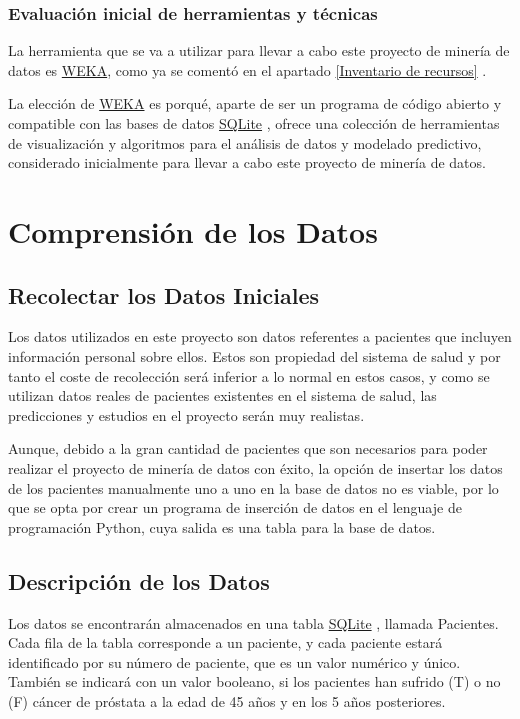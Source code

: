 \documentclass{article}
\begin{document}
\subsubsection{Evaluación inicial de herramientas y técnicas}\label{Evaluación inicial de herramientas y técnicas}
La herramienta que se va a utilizar para llevar a cabo este proyecto de minería de datos es \href{https://www.cs.waikato.ac.nz/~ml/weka/}{WEKA}, como ya se comentó en el apartado \ref{Inventario de recursos} . 

La elección de \href{https://www.cs.waikato.ac.nz/~ml/weka/}{WEKA} es porqué, aparte de ser un programa de código abierto y compatible con las bases de datos \href{https://www.sqlite.org/copyright.html}{SQLite} , ofrece una colección de herramientas de visualización y algoritmos para el análisis de datos y modelado predictivo, considerado inicialmente para llevar a cabo este proyecto de minería de datos.  

\section{Comprensión de los Datos}

\subsection{Recolectar los Datos Iniciales}
Los datos utilizados en este proyecto son datos referentes a pacientes que incluyen información personal sobre ellos. Estos son propiedad del sistema de salud y por tanto el coste de recolección será inferior a lo normal en estos casos, y como se utilizan datos reales de pacientes existentes en el sistema de salud, las predicciones y estudios en el proyecto serán muy realistas.

Aunque, debido a la gran cantidad de pacientes que son necesarios para poder realizar el proyecto de minería de datos con éxito, la opción de insertar los datos de los pacientes manualmente uno a uno en la base de datos no es viable, por lo que se opta por crear un programa de inserción de datos en el lenguaje de programación Python, cuya salida es una tabla para la base de datos.

\subsection{Descripción de los Datos}\label{Descripción de los Datos}
Los datos se encontrarán almacenados en una tabla \href{https://www.sqlite.org/copyright.html}{SQLite} , llamada Pacientes. Cada fila de la tabla corresponde a un paciente, y cada paciente estará identificado por su número de paciente, que es un valor numérico y único. También se indicará con un valor booleano, si los pacientes han sufrido (T) o no (F) cáncer de próstata a la edad de 45 años y en los 5 años posteriores.
\end{document}
